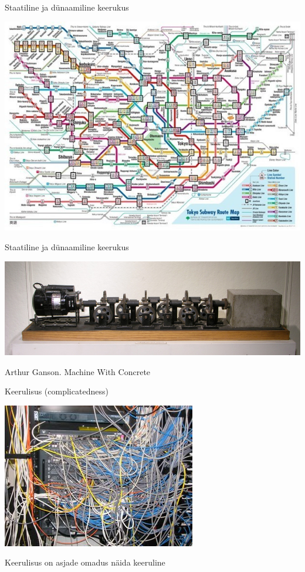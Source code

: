 \documentclass{beamer}
\begin{document}
\begin{frame}{Staatiline ja dünaamiline keerukus}
	\begin{center}
		\includegraphics[width=\textwidth]{tokyo_subway}
	\end{center}
\end{frame}

\begin{frame}{Staatiline ja dünaamiline keerukus}
	\begin{center}
		\includegraphics[width=\textwidth]{arthur-ganson-machine-with-concrete-1992}
	\end{center}
Arthur Ganson. Machine With Concrete
\end{frame}

\begin{frame}{Keerulisus (complicatedness)}
	\begin{center}
		\includegraphics[width=.6\textwidth]{complicatedness}


Keerulisus on asjade omadus näida keeruline

	\end{center}
\end{frame}
\end{document}
